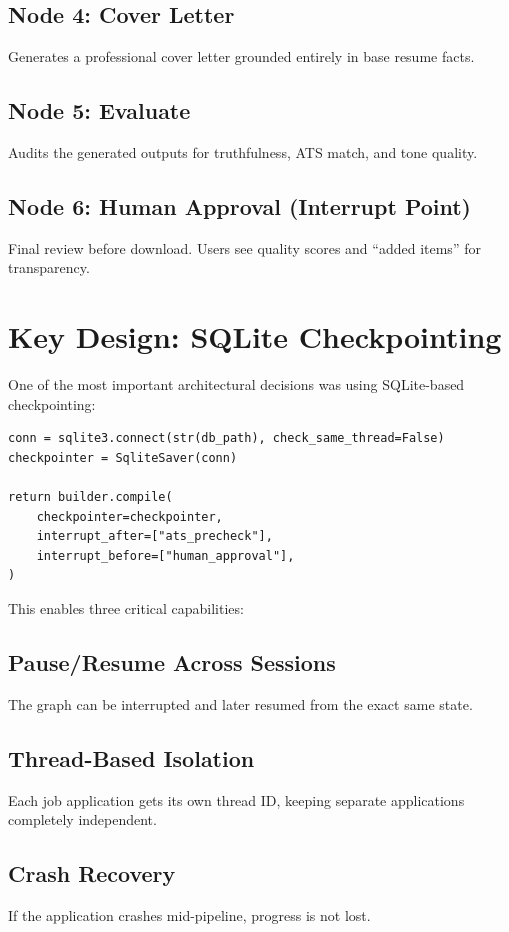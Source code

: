 \documentclass[12pt, a4paper]{article}
\begin{document}
\subsection*{Node 4: Cover Letter}
Generates a professional cover letter grounded entirely in base resume facts.

\subsection*{Node 5: Evaluate}
Audits the generated outputs for truthfulness, ATS match, and tone quality.

\subsection*{Node 6: Human Approval (Interrupt Point)}
Final review before download. Users see quality scores and ``added items'' for transparency.

\newpage

\section{Key Design: SQLite Checkpointing}

One of the most important architectural decisions was using SQLite-based checkpointing:

\begin{verbatim}
conn = sqlite3.connect(str(db_path), check_same_thread=False)
checkpointer = SqliteSaver(conn)

return builder.compile(
    checkpointer=checkpointer,
    interrupt_after=["ats_precheck"],
    interrupt_before=["human_approval"],
)
\end{verbatim}

This enables three critical capabilities:

\subsection*{Pause/Resume Across Sessions}
The graph can be interrupted and later resumed from the exact same state.

\subsection*{Thread-Based Isolation}
Each job application gets its own thread ID, keeping separate applications completely independent.

\subsection*{Crash Recovery}
If the application crashes mid-pipeline, progress is not lost.
\end{document}
